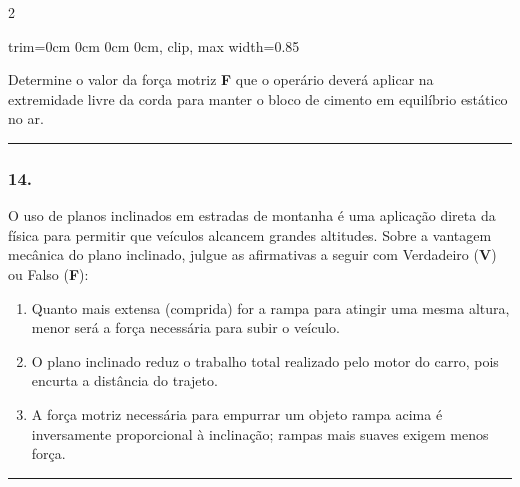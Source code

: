\documentclass[twoside, 10pt, a4paper]{article}
\newlength{\espacoPreQuestao}
\newlength{\espacoQuestao}
\newlength{\espacoAlt}
\newcommand{\larguraTikz}{0.85\linewidth} %
\begin{document}
\begin{multicols*}{2}
\begin{center}
\begin{adjustbox}{trim=0cm 0cm 0cm 0cm, clip, max width=\larguraTikz}
\end{adjustbox}
\end{center}
Determine o valor da força motriz \textbf{F} que o operário deverá aplicar na extremidade livre da corda para manter o bloco de cimento em equilíbrio estático no ar.
\par\vspace{\espacoQuestao}

\noindent\textcolor{CorLinha}{\rule{\linewidth}{0.5pt}} 
\par\vspace{\espacoPreQuestao}
\subsubsection*{14.} O uso de planos inclinados em estradas de montanha é uma aplicação direta da física para permitir que veículos alcancem grandes altitudes. Sobre a vantagem mecânica do plano inclinado, julgue as afirmativas a seguir com Verdadeiro (\textbf{V}) ou Falso (\textbf{F}):
\begin{enumerate}[label=\Roman*., itemsep=\espacoAlt]
    \item Quanto mais extensa (comprida) for a rampa para atingir uma mesma altura, menor será a força necessária para subir o veículo.
    \item O plano inclinado reduz o trabalho total realizado pelo motor do carro, pois encurta a distância do trajeto.
    \item A força motriz necessária para empurrar um objeto rampa acima é inversamente proporcional à inclinação; rampas mais suaves exigem menos força.
\end{enumerate}
\par\vspace{\espacoQuestao}

\noindent\textcolor{CorLinha}{\rule{\linewidth}{0.5pt}} 
\par\vspace{\espacoPreQuestao}

\end{multicols*}
\end{document}
